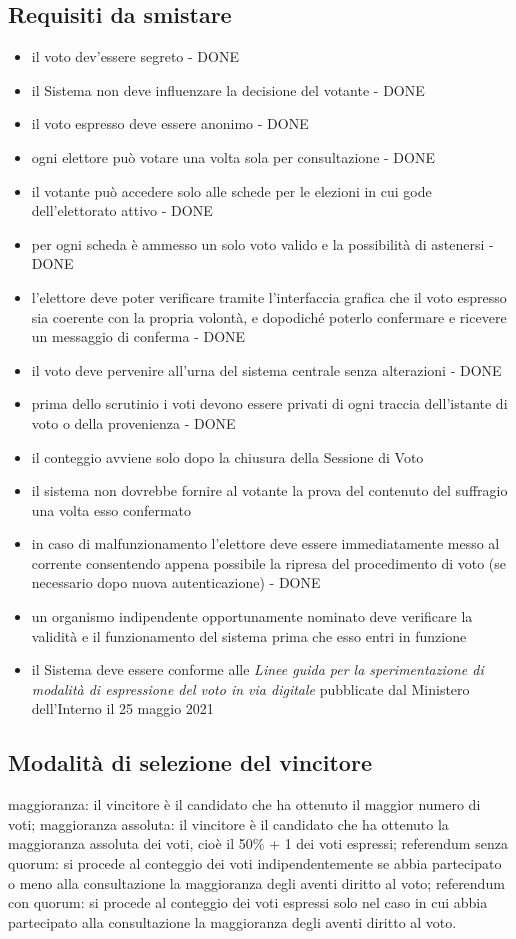 \documentclass{report}
\begin{document}
\subsection{Requisiti da smistare}
\begin{itemize}
	\item il voto dev'essere segreto - DONE
	\item il Sistema non deve influenzare la decisione del votante - DONE
	\item il voto espresso deve essere anonimo - DONE
	\item ogni elettore può votare una volta sola per consultazione - DONE
	\item il votante può accedere solo alle schede per le elezioni in cui gode dell'elettorato attivo - DONE
	\item per ogni scheda è ammesso un solo voto valido e la possibilità di astenersi - DONE
	\item l'elettore deve poter verificare tramite l'interfaccia grafica che il voto espresso sia coerente con la propria volontà, e dopodiché poterlo confermare e ricevere un messaggio di conferma - DONE
	\item il voto deve pervenire all'urna del sistema centrale senza alterazioni - DONE
	\item prima dello scrutinio i voti devono essere privati di ogni traccia dell'istante di voto o della provenienza - DONE
	\item il conteggio avviene solo dopo la chiusura della Sessione di Voto
	\item il sistema non dovrebbe fornire al votante la prova del contenuto del suffragio una volta esso confermato
	\item in caso di malfunzionamento l'elettore deve essere immediatamente messo al corrente consentendo appena possibile la ripresa del procedimento di voto (se necessario dopo nuova autenticazione) - DONE
	\item un organismo indipendente opportunamente nominato deve verificare la validità e il funzionamento del sistema prima che esso entri in funzione
	\item il Sistema deve essere conforme alle \textit{Linee  guida  per  la  sperimentazione  di  modalità  di  espressione  del  voto  in  via digitale} pubblicate dal Ministero dell'Interno il 25 maggio 2021
\end{itemize}


\subsection{Modalità di selezione del vincitore}
	maggioranza: il vincitore è il candidato che ha ottenuto il maggior numero di voti;
	maggioranza assoluta: il vincitore è il candidato che ha ottenuto la maggioranza assoluta dei voti, cioè il 50\% + 1 dei voti espressi;
	referendum senza quorum: si procede al conteggio dei voti indipendentemente se abbia partecipato o meno alla consultazione la maggioranza degli aventi diritto al voto; 
	referendum con quorum: si procede al conteggio dei voti espressi solo nel caso in cui abbia partecipato alla consultazione la maggioranza degli aventi diritto al voto.
\end{document}

